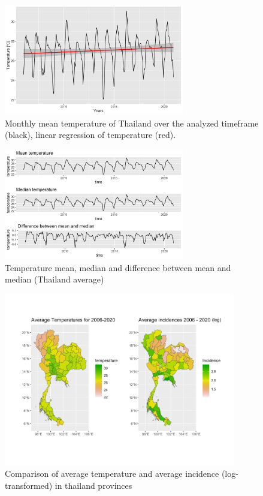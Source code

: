 \documentclass[parskip]{scrartcl}
\begin{document}
\begin{figure}[htbp] 
	\centering
	\includegraphics[width=0.7\textwidth]{fig/temp_over_years.png}
	\caption{Monthly mean temperature of Thailand over the analyzed timeframe (black), linear regression of temperature (red).}
	\label{fig:temp_over_years}
\end{figure}

\begin{figure}[htbp] 
	\centering
	\includegraphics[width=0.7\textwidth]{fig/mean_median_temp.png}
	\caption{Temperature mean, median and difference between mean and median (Thailand average)}
	\label{fig:mean_median_temp}
\end{figure}


\begin{figure}[htbp] 
	\centering
	\includegraphics[width=0.9\textwidth]{fig/t_vs_ilog.jpg}
	\caption{Comparison of average temperature and average incidence (log-transformed) in thailand provinces}
	\label{fig:tvsilogmap}
\end{figure}


	
\end{document}
